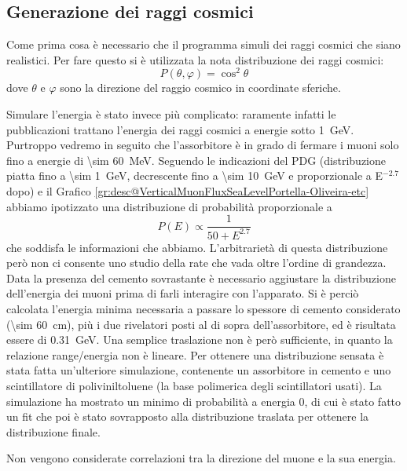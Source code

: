 \subsection{Generazione dei raggi cosmici}
Come prima cosa è necessario che il programma simuli dei raggi cosmici che siano realistici. Per fare questo si è utilizzata la nota distribuzione dei raggi cosmici:
\begin{equation}
	P\left(\theta, \varphi\right) = \cos^2{\theta}
	\label{eq:distr_cosmici}
\end{equation}
dove $\theta$ e $\varphi$ sono la direzione del raggio cosmico in coordinate sferiche.

Simulare l'energia \`e stato invece pi\`u complicato: raramente infatti le pubblicazioni trattano l'energia dei raggi cosmici a energie sotto \SI{1}{\GeV}. Purtroppo vedremo in seguito che l'assorbitore \`e in grado di fermare i muoni solo fino a energie di \SI{\sim 60}{\MeV}. Seguendo le indicazioni del PDG \cite{bib:Patrignani:2016xqp} (distribuzione piatta fino a \SI{\sim 1}{\GeV}, decrescente fino a \SI{\sim 10}{\GeV} e proporzionale a E$^{-2.7}$ dopo) e il Grafico \ref{gr:desc@VerticalMuonFluxSeaLevelPortella-Oliveira-etc} abbiamo ipotizzato una distribuzione di probabilit\`a proporzionale a 
\begin{equation}
	P\left(E\right) \propto \frac{1}{50+E^{2.7}}
	\label{eq:distr_cosmici_en}
\end{equation}
che soddisfa le informazioni che abbiamo. L'arbitrariet\`a di questa distribuzione per\`o non ci consente uno studio della rate che vada oltre l'ordine di grandezza.
Data la presenza del cemento sovrastante \`e necessario aggiustare la distribuzione dell'energia dei muoni prima di farli interagire con l'apparato. 
Si \`e perci\`o calcolata l'energia minima necessaria a passare lo spessore di cemento considerato (\SI{\sim 60}{\cm}), pi\`u i due rivelatori posti al di sopra dell'assorbitore, ed \`e risultata essere di \SI{0.31}{\GeV}. 
Una semplice traslazione non \`e per\`o sufficiente, in quanto la relazione range/energia non \`e lineare. 
Per ottenere una distribuzione sensata \`e stata fatta un'ulteriore simulazione, contenente un assorbitore in cemento e uno scintillatore di poliviniltoluene (la base polimerica degli scintillatori usati). 
La simulazione ha mostrato un minimo di probabilit\`a a energia 0, di cui \`e stato fatto un fit che poi \`e stato sovrapposto alla distribuzione traslata per ottenere la distribuzione finale.

Non vengono considerate correlazioni tra la direzione del muone e la sua energia.

